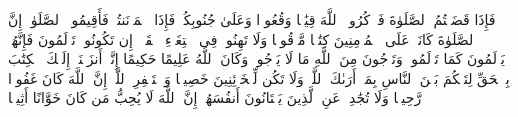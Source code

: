 \stopbuffer
\startbuffer[\q:4:103]
فَإِذَا قَضَیۡتُمُ ٱلصَّلَوٰةَ فَٱذۡكُرُوا۟ ٱللَّهَ قِیَٰمࣰا وَقُعُودࣰا وَعَلَىٰ جُنُوبِكُمۡۚ فَإِذَا ٱطۡمَأۡنَنتُمۡ فَأَقِیمُوا۟ ٱلصَّلَوٰةَۚ إِنَّ ٱلصَّلَوٰةَ كَانَتۡ عَلَى ٱلۡمُؤۡمِنِینَ كِتَٰبࣰا مَّوۡقُوتࣰا%
\stopbuffer
\startbuffer[\q:4:104]
وَلَا تَهِنُوا۟ فِی ٱبۡتِغَاۤءِ ٱلۡقَوۡمِۖ إِن تَكُونُوا۟ تَأۡلَمُونَ فَإِنَّهُمۡ یَأۡلَمُونَ كَمَا تَأۡلَمُونَۖ وَتَرۡجُونَ مِنَ ٱللَّهِ مَا لَا یَرۡجُونَۗ وَكَانَ ٱللَّهُ عَلِیمًا حَكِیمًا%
\stopbuffer
\startbuffer[\q:4:105]
إِنَّاۤ أَنزَلۡنَاۤ إِلَیۡكَ ٱلۡكِتَٰبَ بِٱلۡحَقِّ لِتَحۡكُمَ بَیۡنَ ٱلنَّاسِ بِمَاۤ أَرَىٰكَ ٱللَّهُۚ وَلَا تَكُن لِّلۡخَاۤئِنِینَ خَصِیمࣰا%
\stopbuffer
\startbuffer[\q:4:106]
وَٱسۡتَغۡفِرِ ٱللَّهَۖ إِنَّ ٱللَّهَ كَانَ غَفُورࣰا رَّحِیمࣰا%
\stopbuffer
\startbuffer[\q:4:107]
وَلَا تُجَٰدِلۡ عَنِ ٱلَّذِینَ یَخۡتَانُونَ أَنفُسَهُمۡۚ إِنَّ ٱللَّهَ لَا یُحِبُّ مَن كَانَ خَوَّانًا أَثِیمࣰا%
\stopbuffer
